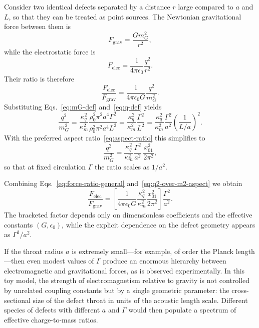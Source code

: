 \documentclass[11pt]{article}
\begin{document}
Consider two identical defects separated by a distance $r$ large compared to $a$ and $L$, so that they can be treated as point sources.  The Newtonian gravitational force between them is
\begin{equation}
F_{\mathrm{grav}} = \frac{G m_G^2}{r^2},
\end{equation}
while the electrostatic force is
\begin{equation}
F_{\mathrm{elec}} = \frac{1}{4\pi \epsilon_0} \frac{q^2}{r^2}.
\end{equation}
Their ratio is therefore
\begin{equation}
\frac{F_{\mathrm{elec}}}{F_{\mathrm{grav}}}
= \frac{1}{4\pi \epsilon_0 G} \frac{q^2}{m_G^2}.
\label{eq:force-ratio-general}
\end{equation}
Substituting Eqs.~\eqref{eq:mG-def} and~\eqref{eq:q-def} yields
\begin{equation}
\frac{q^2}{m_G^2}
= \frac{\kappa_q^2}{\kappa_m^2}
  \frac{\rho_0^2 \pi^2 a^4 \Gamma^2}
       {\rho_0^2 \pi^2 a^4 L^2}
= \frac{\kappa_q^2}{\kappa_m^2}
  \frac{\Gamma^2}{L^2}
= \frac{\kappa_q^2}{\kappa_m^2}
  \frac{\Gamma^2}{a^2}\left(\frac{1}{L/a}\right)^2.
\label{eq:q2-over-m2}
\end{equation}
With the preferred aspect ratio~\eqref{eq:aspect-ratio} this simplifies to
\begin{equation}
\frac{q^2}{m_G^2}
= \frac{\kappa_q^2}{\kappa_m^2}
  \frac{\Gamma^2}{a^2}\,
  \frac{x_{01}^2}{2\pi^2},
\label{eq:q2-over-m2-aspect}
\end{equation}
so that at fixed circulation $\Gamma$ the ratio scales as $1/a^2$.

Combining Eqs.~\eqref{eq:force-ratio-general} and~\eqref{eq:q2-over-m2-aspect} we obtain
\begin{equation}
\frac{F_{\mathrm{elec}}}{F_{\mathrm{grav}}}
= \left[\frac{1}{4\pi \epsilon_0 G}
        \frac{\kappa_q^2}{\kappa_m^2}
        \frac{x_{01}^2}{2\pi^2}\right]
  \frac{\Gamma^2}{a^2}.
\label{eq:force-ratio-scaling}
\end{equation}
The bracketed factor depends only on dimensionless coefficients and the effective constants $(G,\epsilon_0)$, while the explicit dependence on the defect geometry appears as $\Gamma^2/a^2$.

If the throat radius $a$ is extremely small---for example, of order the Planck length---then even modest values of $\Gamma$ produce an enormous hierarchy between electromagnetic and gravitational forces, as is observed experimentally.  In this toy model, the strength of electromagnetism relative to gravity is not controlled by unrelated coupling constants but by a single geometric parameter: the cross-sectional size of the defect throat in units of the acoustic length scale.  Different species of defects with different $a$ and $\Gamma$ would then populate a spectrum of effective charge-to-mass ratios.
\end{document}
